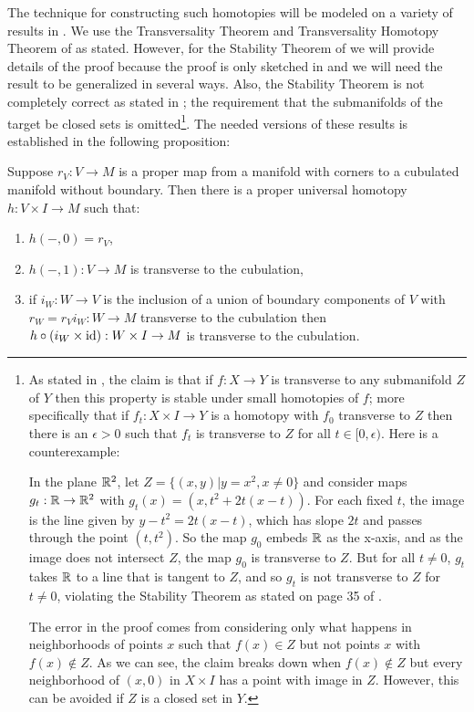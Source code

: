  The technique for constructing such homotopies will be modeled on a variety of results in \cite{GuPo74}. We use the Transversality Theorem and Transversality Homotopy Theorem of \cite[Section 2.3]{GuPo74} as stated. However, for the Stability Theorem of \cite[Section 1.6]{GuPo74} we will provide details of the proof because the proof is only sketched in \cite{GuPo74} and we will need the result to be generalized in several ways. Also, the Stability Theorem is not completely correct as stated in \cite[Section 1.6]{GuPo74}; the requirement that the submanifolds of the target be closed sets is omitted\footnote{As stated in \cite{GuPo74}, the claim is that if $f:X\to Y$ is transverse to any submanifold $Z$ of $Y$ then this property is stable under small homotopies of $f$; more specifically that if $f_t:X\times I\to Y$ is a homotopy with $f_0$ transverse to $Z$ then there is an $\epsilon>0$ such that $f_t$ is transverse to $Z$ for all $t\in[0,\epsilon)$. Here is a counterexample:

In the plane $\mathbb{R}^2$, let $Z=\{(x,y)|y=x^2, x\neq 0\}$ and consider maps  $g_t: \mathbb{R} \to \mathbb{R}^2$ with 
$g_t(x)=(x,t^2+2t(x-t))$. For each fixed $t$, the image is the line given by $y-t^2=2t(x-t)$, which has slope $2t$ and passes through the point $(t,t^2)$. So the map $g_0$ embeds $\mathbb{R}$ as the x-axis, and as the image does not intersect $Z$, the map $g_0$ is transverse to $Z$. But for all $t\neq 0$, $g_t$ takes $\mathbb{R}$ to a line that is tangent to $Z$, and so $g_t$ is not transverse to $Z$ for $t\neq 0$, violating the Stability Theorem as stated on page 35 of \cite{GuPo74}. 

The error in the proof comes from considering only what happens in neighborhoods of points $x$ such that $f(x)\in Z$ but not points $x$ with $f(x)\notin Z$. As we can see, the claim breaks down when $f(x)\notin Z$ but every neighborhood of $(x,0)$ in $X\times I$ has a point with image in $Z$. However, this can be avoided if $Z$ is a closed set in $Y$.}. The needed versions of these results is established in the following proposition:




\begin{proposition}\label{P: ball stability}
Suppose  $r_V:V\to M$ is a proper map from a manifold with corners to a cubulated manifold without boundary.  Then there is a proper universal homotopy $h:V\times I\to M$ such that: 
\begin{enumerate}
\item $h(-,0)=r_V$,

\item $h(-,1):V\to M$ is transverse to the cubulation,

\item  if $i_W:W\to V$ is the inclusion of a union of boundary components of $V$ with $r_W=r_Vi_W:W\to M$ transverse to the cubulation then $h\circ(i_{W}\times \mathrm{id}):W\times I\to M$ is transverse to the cubulation. 

\end{enumerate}
\end{proposition}



